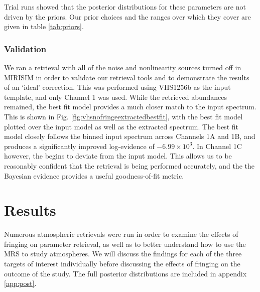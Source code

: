 Trial runs showed that the posterior distributions for these parameters are not driven by the priors.
Our prior choices and the ranges over which they cover are given in table \ref{tab:priors}.

\subsubsection{Validation}
We ran a retrieval with all of the noise and nonlinearity sources turned off in MIRISIM in order to validate our retrieval tools and to demonstrate the results of an `ideal' correction. 
This was performed using VHS1256b as the input template, and only Channel 1 was used.
While the retrieved abundances remained, the best fit model provides a much closer match to the input spectrum.
This is shown in Fig. \ref{fig:vhsnofringeextractedbestfit}, with the best fit model plotted over the input model as well as the extracted spectrum.
The best fit model closely follows the binned input spectrum across Channels 1A and 1B, and produces a significantly improved log-evidence of $-6.99\times10^{3}$. 
In Channel 1C however, the begins to deviate from the input model.
This allows us to be reasonably confident that the retrieval is being performed accurately, and the the Bayesian evidence provides a useful goodness-of-fit metric.

\clearpage
\section{Results}
Numerous atmospheric retrievals were run in order to examine the effects of fringing on parameter retrieval, as well as to better understand how to use the MRS to study atmospheres.
We will discuss the findings for each of the three targets of interest individually before discussing the effects of fringing on the outcome of the study.
The full posterior distributions are included in appendix \ref{app:post}.

